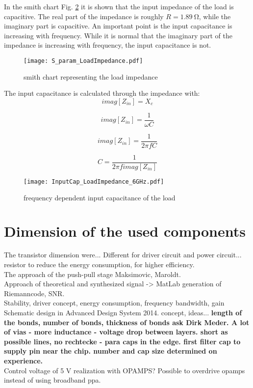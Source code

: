 In the smith chart Fig. \ref{fig:smith_load_impedance} it is shown that the input impedance of the load is capacitive. The real part of the impedance is roughly $R = \SI{1.89}{\ohm}$, while the imaginary part is capacitive. An important point is the input capacitance is increasing with frequency. While it is normal that the imaginary part of the impedance is increasing with frequency, the input capacitance is not.

 \begin{figure}[ht]
	\centering
  \texttt{[image: S\_param\_LoadImpedance.pdf]}
	\caption{smith chart representing the load impedance}
	\label{fig:smith_load_impedance}
\end{figure}

The input capacitance is calculated through the impedance with:
\begin{equation}
imag[Z_{in}] = X_c
\end{equation}

\begin{equation}
imag[Z_{in}] = \frac{1}{\omega C}
\end{equation}

\begin{equation}
imag[Z_{in}] = \frac{1}{2 \pi f C}
\end{equation}

\begin{equation}
C = \frac{1}{2 \pi f imag[Z_{in}]}
\end{equation}

 \begin{figure}[ht]
	\centering
  \texttt{[image: InputCap\_LoadImpedance\_6GHz.pdf]}
	\caption{frequency dependent input capacitance of the load}
	\label{fig:smith_load_impedance}
\end{figure}
\section{Dimension of the used components}
The transistor dimension were... Different for driver circuit and power circuit... resistor to reduce the energy  consumption, for higher efficiency. \\ The
approach of the push-pull stage Maksimovic, Maroldt.\\
Approach of theoretical and synthesized signal -> MatLab generation of Riemanncode, SNR.\\ Stability, driver concept, energy consumption, frequency bandwidth, gain
Schematic design in Advanced Design System 2014. concept, ideas... 
\textbf{length of the bonds, number of bonds, thickness of bonds ask Dirk Meder. A lot of vias - more inductance - voltage drop between layers. short as possible lines, no rechtecke - para caps in the edge. first filter cap to supply pin near the chip. number and cap size determined on experience. }\\
Control voltage of 5 V realization with OPAMPS? Possible to overdrive opamps instead of using broadband ppa. 


